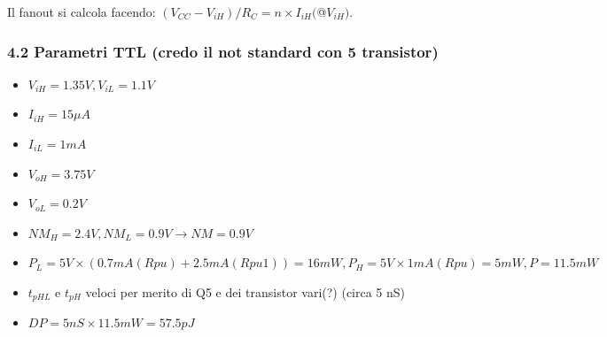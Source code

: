 \documentclass[
]{article}
\providecommand{\tightlist}{%
  \setlength{\itemsep}{0pt}\setlength{\parskip}{0pt}}
\begin{document}
Il fanout si calcola facendo:
\((V_{CC}-V_{iH})/R_{C}=n\times I_{iH}(\)@\(V_{iH})\).

\subsubsection{4.2 Parametri TTL (credo il not standard con 5
transistor)}\label{parametri-ttl-credo-il-not-standard-con-5-transistor}

\begin{itemize}
\tightlist
\item
  \(V_{iH} = 1.35V, V_{iL} = 1.1V\)
\item
  \(I_{iH} = 15\mu A\)
\item
  \(I_{iL} = 1mA\)
\item
  \(V_{oH} = 3.75V\)
\item
  \(V_{oL} = 0.2V\)
\item
  \(NM_{H} = 2.4V, NM_{L} = 0.9V \to NM = 0.9V\)
\item
  \(P_{L} = 5V\times(0.7mA (Rpu)+2.5mA (Rpu1)) = 16mW, P_{H} = 5V\times 1mA (Rpu) = 5mW, P=11.5mW\)
\item
  \(t_{pHL}\) e \(t_{pH}\) veloci per merito di Q5 e dei transistor
  vari(?) (circa 5 nS)
\item
  \(DP = 5nS\times 11.5mW = 57.5pJ\)
\end{itemize}
\end{document}
